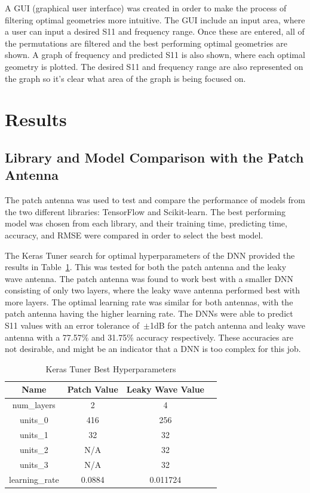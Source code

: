 \documentclass[lettersize,journal]{IEEEtran}
\begin{document}
A GUI (graphical user interface) was created in order to make the process of filtering optimal geometries more intuitive. The GUI include an input area, where a user can input a desired S11 and frequency range. Once these are entered, all of the permutations are filtered and the best performing optimal geometries are shown. A graph of frequency and predicted S11 is also shown, where each optimal geometry is plotted. The desired S11 and frequency range are also represented on the graph so it's clear what area of the graph is being focused on.


\section{Results}
\subsection{Library and Model Comparison with the Patch Antenna}
The patch antenna was used to test and compare the performance of models from the two different libraries: TensorFlow and Scikit-learn. The best performing model was chosen from each library, and their training time, predicting time, accuracy, and RMSE were compared in order to select the best model.

The Keras Tuner search for optimal hyperparameters of the DNN provided the results in Table~\ref{keras_best_params}. This was tested for both the patch antenna and the leaky wave antenna. The patch antenna was found to work best with a smaller DNN consisting of only two layers, where the leaky wave antenna performed best with more layers. The optimal learning rate was similar for both antennas, with the patch antenna having the higher learning rate. The DNNs were able to predict S11 values with an error tolerance of~$\pm$1dB for the patch antenna and leaky wave antenna with a 77.57\% and 31.75\% accuracy respectively. These accuracies are not desirable, and might be an indicator that a DNN is too complex for this job.

\begin{table}[h]
\caption{Keras Tuner Best Hyperparameters}
\begin{center}
\begin{tabular}{ |c|c|c|c| }
    \hline
    Name & Patch Value & Leaky Wave Value \\ 
    \hline
    num\_layers & 2 & 4 \\  
    \hline
    units\_0 & 416 & 256 \\
    \hline
    units\_1 & 32 & 32 \\
    \hline
    units\_2 & N/A & 32 \\
    \hline
    units\_3 & N/A & 32 \\
    \hline
    learning\_rate & 0.0884 & 0.011724 \\
    \hline
\end{tabular}
\end{center}
\label{keras_best_params}
\end{table}
\end{document}
